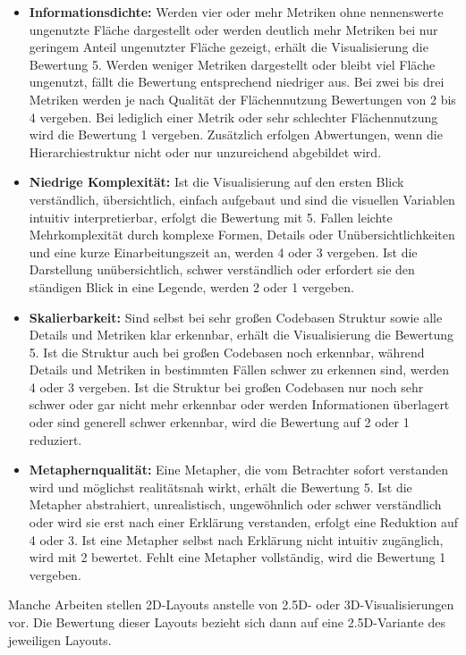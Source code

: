 \begin{itemize}
    \item \textbf{Informationsdichte:} Werden vier oder mehr Metriken ohne nennenswerte ungenutzte Fläche dargestellt oder werden deutlich mehr Metriken bei nur geringem Anteil ungenutzter Fläche gezeigt, erhält die Visualisierung die Bewertung 5. Werden weniger Metriken dargestellt oder bleibt viel Fläche ungenutzt, fällt die Bewertung entsprechend niedriger aus. Bei zwei bis drei Metriken werden je nach Qualität der Flächennutzung Bewertungen von 2 bis 4 vergeben. Bei lediglich einer Metrik oder sehr schlechter Flächennutzung wird die Bewertung 1 vergeben. Zusätzlich erfolgen Abwertungen, wenn die Hierarchiestruktur nicht oder nur unzureichend abgebildet wird.
    \item \textbf{Niedrige Komplexität:} Ist die Visualisierung auf den ersten Blick verständlich, übersichtlich, einfach aufgebaut und sind die visuellen Variablen intuitiv interpretierbar, erfolgt die Bewertung mit 5. Fallen leichte Mehrkomplexität durch komplexe Formen, Details oder Unübersichtlichkeiten und eine kurze Einarbeitungszeit an, werden 4 oder 3 vergeben. Ist die Darstellung unübersichtlich, schwer verständlich oder erfordert sie den ständigen Blick in eine Legende, werden 2 oder 1 vergeben.
    \item \textbf{Skalierbarkeit:} Sind selbst bei sehr großen Codebasen Struktur sowie alle Details und Metriken klar erkennbar, erhält die Visualisierung die Bewertung 5. Ist die Struktur auch bei großen Codebasen noch erkennbar, während Details und Metriken in bestimmten Fällen schwer zu erkennen sind, werden 4 oder 3 vergeben. Ist die Struktur bei großen Codebasen nur noch sehr schwer oder gar nicht mehr erkennbar oder werden Informationen überlagert oder sind generell schwer erkennbar, wird die Bewertung auf 2 oder 1 reduziert.
    \item \textbf{Metaphernqualität:} Eine Metapher, die vom Betrachter sofort verstanden wird und möglichst realitätsnah wirkt, erhält die Bewertung 5. Ist die Metapher abstrahiert, unrealistisch, ungewöhnlich oder schwer verständlich oder wird sie erst nach einer Erklärung verstanden, erfolgt eine Reduktion auf 4 oder 3. Ist eine Metapher selbst nach Erklärung nicht intuitiv zugänglich, wird mit 2 bewertet. Fehlt eine Metapher vollständig, wird die Bewertung 1 vergeben.
\end{itemize}

Manche Arbeiten stellen 2D-Layouts anstelle von 2{.}5D- oder 3D-Visualisierungen vor. Die Bewertung dieser Layouts bezieht sich dann auf eine 2{.}5D-Variante des jeweiligen Layouts.

